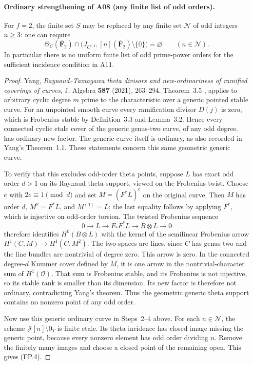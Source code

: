 \paragraph{Ordinary strengthening of A08 (any finite list of odd orders).}
For $f=2$, the finite set $S$ may be replaced by any finite set
$\mathcal N$ of odd integers $n\ge3$: one can require
\[
 \Theta_C(\overline{\mathbf F}_2)\cap
 \bigl(J_{C^{(1)}}[n](\overline{\mathbf F}_2)\setminus\{0\}\bigr)
 =\varnothing\qquad(n\in\mathcal N).
 \tag{FP.4}
\]
In particular there is no uniform finite list of odd prime-power
orders for the sufficient incidence condition in A11.

\begin{proof}
Yang, \emph{Raynaud--Tamagawa theta divisors and new-ordinariness of
ramified coverings of curves}, J. Algebra \textbf{587} (2021),
263--294, Theorem~3.5 \cite{Yang2021}, applies to arbitrary cyclic degree $m$
prime to the characteristic over a generic pointed stable curve.
For an unpointed smooth curve every ramification divisor $D(j)$
is zero, which is Frobenius stable by Definition~3.3 and
Lemma~3.2.  Hence every connected cyclic etale cover of the
generic genus-two curve, of any odd degree, has ordinary new
factor.  The generic curve itself is ordinary, as also recorded
in Yang's Theorem~1.1.  These statements concern this same
geometric generic curve.

To verify that this excludes odd-order theta points, suppose $L$
has exact odd order $d>1$ on its Raynaud theta support, viewed on
the Frobenius twist.  Choose $e$ with $2e\equiv1\pmod d$ and set
$M=(F^*L)^e$ on the original curve.  Then $M$ has order $d$,
$M^2=F^*L$, and $M^{(1)}=L$; the last equality follows by applying
$F^*$, which is injective on odd-order torsion.
The twisted Frobenius sequence
\[
 0\longrightarrow L\longrightarrow F_*F^*L
 \longrightarrow B\otimes L\longrightarrow0
\]
therefore identifies $H^0(B\otimes L)$ with the kernel of the
semilinear Frobenius arrow
$H^1(C,M)\to H^1(C,M^2)$.
The two spaces are lines, since $C$ has genus two and the line
bundles are nontrivial of degree zero.  This arrow is zero.
In the connected degree-$d$ Kummer cover defined by $M$, it is
one arrow in the nontrivial-character sum of $H^1(\mathcal O)$.
That sum is Frobenius stable, and its Frobenius is not injective,
so its stable rank is smaller than its dimension.  Its new
factor is therefore not ordinary, contradicting Yang's theorem.
Thus the geometric generic theta support contains no nonzero
point of any odd order.

Now use this generic ordinary curve in Steps~2--4 above.  For each
$n\in\mathcal N$, the scheme $\mathcal J[n]\setminus0_T$ is finite
etale.  Its theta incidence has closed image missing the generic
point, because every nonzero element has odd order dividing $n$.
Remove the finitely many images and choose a closed point of the
remaining open.  This gives (FP.4).
\end{proof}

